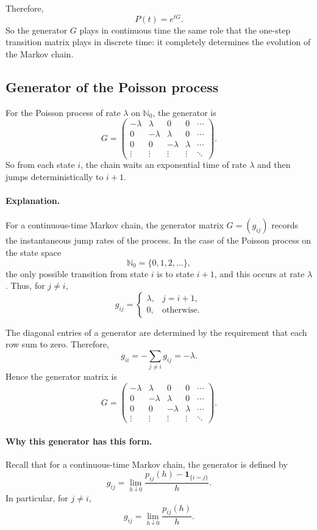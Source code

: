 \documentclass[11pt]{article}
\theoremstyle{definition}
\begin{document}
Therefore,
\[
P(t)=e^{tG}.
\]
So the generator \(G\) plays in continuous time the same role that the one-step transition matrix plays in discrete time: it completely determines the evolution of the Markov chain.

\subsection{Generator of the Poisson process}

For the Poisson process of rate $\lambda$ on $\mathbb N_0$, the generator is
\[
G=
\begin{pmatrix}
-\lambda & \lambda & 0 & 0 & \cdots \\
0 & -\lambda & \lambda & 0 & \cdots \\
0 & 0 & -\lambda & \lambda & \cdots \\
\vdots & \vdots & \vdots & \vdots & \ddots
\end{pmatrix}.
\]
So from each state $i$, the chain waits an exponential time of rate $\lambda$ and then jumps deterministically to $i+1$.

\paragraph{Explanation.}
For a continuous-time Markov chain, the generator matrix \(G=(g_{ij})\) records the instantaneous jump rates of the process. In the case of the Poisson process on the state space
\[
\mathbb N_0=\{0,1,2,\dots\},
\]
the only possible transition from state \(i\) is to state \(i+1\), and this occurs at rate \(\lambda\). Thus, for \(j\neq i\),
\[
g_{ij}=
\begin{cases}
\lambda, & j=i+1,\\
0, & \text{otherwise}.
\end{cases}
\]

The diagonal entries of a generator are determined by the requirement that each row sum to zero. Therefore,
\[
g_{ii}=-\sum_{j\neq i} g_{ij}=-\lambda.
\]
Hence the generator matrix is
\[
G=
\begin{pmatrix}
-\lambda & \lambda & 0 & 0 & \cdots\\
0 & -\lambda & \lambda & 0 & \cdots\\
0 & 0 & -\lambda & \lambda & \cdots\\
\vdots & \vdots & \vdots & \vdots & \ddots
\end{pmatrix}.
\]

\paragraph{Why this generator has this form.}
Recall that for a continuous-time Markov chain, the generator is defined by
\[
g_{ij}
=
\lim_{h\downarrow 0}\frac{p_{ij}(h)-\mathbf 1_{\{i=j\}}}{h}.
\]
In particular, for \(j\neq i\),
\[
g_{ij}
=
\lim_{h\downarrow 0}\frac{p_{ij}(h)}{h}.
\]
\end{document}
